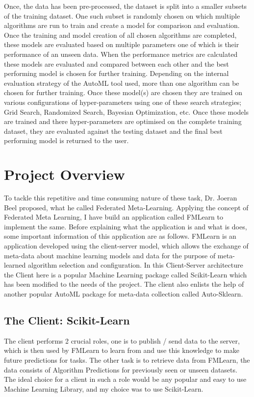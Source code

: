 Once, the data has been pre-processed, the dataset is split into a smaller subsets of the training dataset. One such subset is randomly chosen on which multiple algorithms are run to train and create a model for comparison and evaluation. Once the training and model creation of all chosen algorithms are completed, these models are evaluated based on multiple parameters one of which is their performance of an unseen data. When the performance metrics are calculated these models are evaluated and compared between each other and the best performing model is chosen for further training. Depending on the internal evaluation strategy of the AutoML tool used, more than one algorithm can be chosen for further training. Once these model(s) are chosen they are trained on various configurations of hyper-parameters using one of these search strategies; Grid Search, Randomized Search, Bayesian Optimization, etc. Once these models are trained and there hyper-parameters are optimised on the complete training dataset, they are evaluated against the testing dataset and the final best performing model is returned to the user.

\section{Project Overview}
To tackle this repetitive and time consuming nature of these task, Dr. Joeran Beel proposed, what he called Federated Meta-Learning. Applying the concept of Federated Meta Learning, I have build an application called FMLearn to implement the same. Before explaining what the application is and what is does, some important information of this application are as follows. FMLearn is an application developed using the client-server model, which allows the exchange of meta-data about machine learning models and data for the purpose of meta-learned algorithm selection and configuration. In this Client-Server architecture the Client here is a popular Machine Learning package called Scikit-Learn which has been modified to the needs of the project. The client also enlists the help of another popular AutoML package for meta-data collection called Auto-Sklearn. 

\subsection{The Client: Scikit-Learn}
The client performs 2 crucial roles, one is to publish / send data to the server, which is then used by FMLearn to learn from and use this knowledge to make future predictions for tasks. The other task is to retrieve data from FMLearn, the data consists of Algorithm Predictions for previously seen or unseen datasets. The ideal choice for a client in such a role would be any popular and easy to use Machine Learning Library, and my choice was to use Scikit-Learn.

